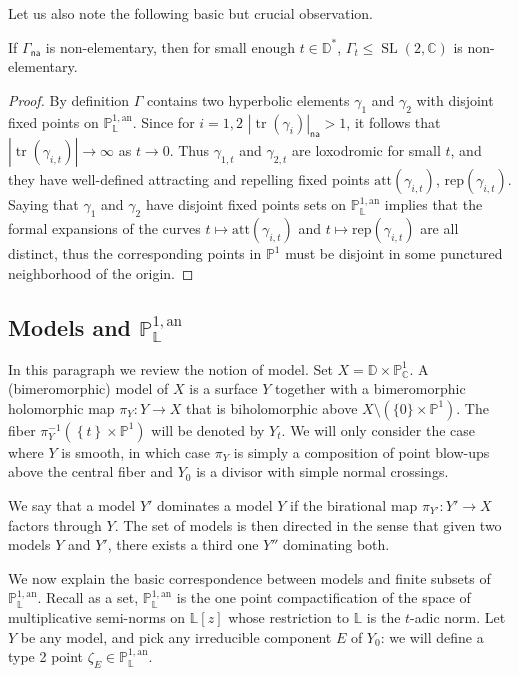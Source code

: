 \documentclass[AHL,Unicode,longabstracts]{cedram}
\DeclareMathOperator{\tr}{tr}
\DeclareMathOperator{\SL}{SL}
\newcommand{\cc}{\mathbb{C}}
\newcommand{\dD}{\mathbb{D}}
\newcommand{\an}{\mathrm{an}}
\newcommand{\cv}{\rightarrow}
\newcommand{\set}[1]{\left\{#1\right\}}
\newcommand{\abs}[1]{\left\vert#1\right\vert}
\newcommand{\pu}{{\mathbb{P}^1}}
\newcommand{\PP}{\mathbb{P}}
\newcommand{\berkl}{\mathbb P^{1,\an}_{\Laurent}}
\newcommand{\Laurent}{\mathbb{L}}
\newcommand{\att}{\mathrm{att}}
\newcommand{\rep}{\mathrm{rep}}
\newcommand{\na}{\mathsf{na}}
\newcommand{\SLC}{\SL(2,\mathbb C)}
\newcommand{\inv}{^{-1}}
\begin{document}
Let us also note the following basic but crucial observation.

\begin{lemm}\label{lem:specialization NE}
If $\Gamma_\na$ is non-elementary, then for small enough $t\in \dD^*$, $\Gamma_t\leq \SLC$ is non-elementary.
\end{lemm}

\begin{proof}
By definition $\Gamma$ contains two hyperbolic elements $\gamma_1$ and $\gamma_2$ with disjoint fixed points on $\PP^{1,\an}_{\Laurent}$. Since for $i=1,2$ $\abs{\tr (\gamma_i)}_\na>1$, it follows that $\abs{\tr(\gamma_{i,t})} \to \infty$ as $t\cv 0$. Thus $\gamma_{1,t}$ and $\gamma_{2,t}$ are loxodromic for small $t$, and they have well-defined attracting and repelling fixed points $\att(\gamma_{i,t})$, $\rep(\gamma_{i,t})$. Saying that $\gamma_1$ and $\gamma_2$ have disjoint fixed points sets on $\berkl$ implies that the formal expansions of the curves $t\mapsto \att(\gamma_{i,t})$ and $t\mapsto \rep(\gamma_{i,t})$ are all distinct, thus the corresponding points in $\pu$ must be disjoint in some punctured neighborhood of the origin.
\end{proof}

\subsection{Models and \texorpdfstring{$\PP^{1,\an}_{\Laurent}$}{PP1, an Laurent}} \label{subs:models}

In this paragraph we review the notion of model. Set $X = \dD\times \PP^1_\cc$. A (bimeromorphic) model of $X$ is a surface $Y$ together with a bimeromorphic holomorphic map $\pi_Y:Y\to X$ that is biholomorphic above $X\setminus (\{0\}\times \pu)$. The fiber $\pi_Y\inv(\set{t}\times \pu)$ will be denoted by $Y_t$. We will only consider the case where $Y$ is smooth, in which case $\pi_Y$ is simply a composition of point blow-ups above the central fiber and $Y_0$ is a divisor with simple normal crossings.

We say that a model $Y'$ dominates a model $Y$ if the birational map $\pi_{Y'}:Y'\cv X$ factors through $Y$. The set of models is then directed in the sense that given two models $Y$ and $Y'$, there exists a third one $Y''$ dominating both.

We now explain the basic correspondence between models and finite subsets of $\berkl$. Recall as a set, $\PP^{1,\an}_{\Laurent}$ is the one point compactification of the space of multiplicative semi-norms on $\Laurent[z]$ whose restriction to $\Laurent$ is the $t$-adic norm. Let $Y$ be any model, and pick any irreducible component $E$ of $Y_0$: we will define a type 2 point $\zeta_E \in \PP^{1,\an}_{\Laurent}$.
\end{document}
